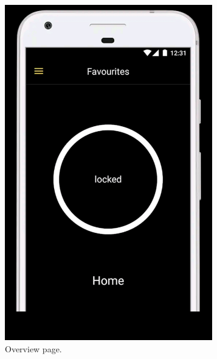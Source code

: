 \begin{figure}[ht]
    \centering
    \captionsetup[subfigure]{justification=centering}
    \begin{subfigure}[b]{0.29\textwidth}
        \centering
        \includegraphics[width=0.99\textwidth, frame]{figures/unlocknukiapp.jpg}
        \caption{Overview page.}
        \label{fig:unlocknukiapp}
    \end{subfigure}
    \hfill
    \begin{subfigure}[b]{0.29\textwidth}
        \centering

\end{subfigure}
\end{figure}
